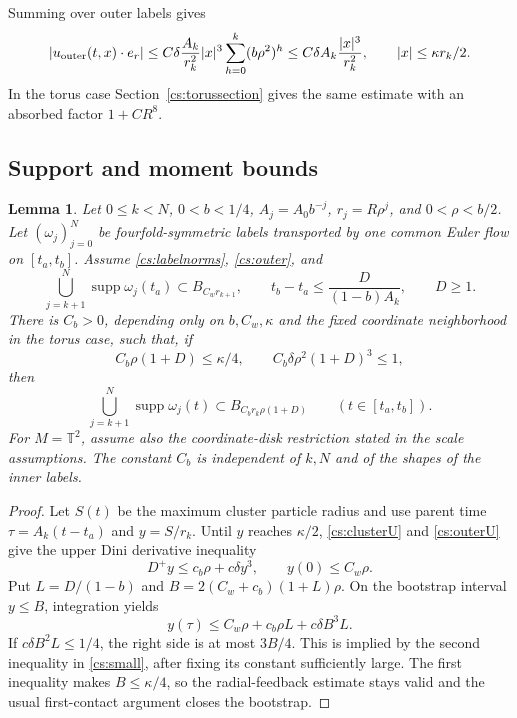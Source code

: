 \documentclass[11pt]{amsart}
\newtheorem{lemma}[theorem]{Lemma}
\theoremstyle{remark}
\numberwithin{equation}{section}
\newcommand{\T}{\mathbb T}
\begin{document}
Summing over outer labels gives
\begin{equation}\label{cs:outerU}
 |u_{\rm outer}(t,x)\cdot e_r|
 \le C\delta\frac{A_k}{r_k^2}|x|^3
 \sum_{h=0}^k(b\rho^2)^h
 \le C\delta A_k\frac{|x|^3}{r_k^2},
 \qquad |x|\le\kappa r_k/2.
\end{equation}
In the torus case Section~\ref{cs:torussection} gives the same estimate with an absorbed factor $1+CR^8$.

\subsection{Support and moment bounds}
\begin{lemma}
\label{cs:supportlemma}
Let $0\le k<N$, $0<b<1/4$, $A_j=A_0b^{-j}$,
$r_j=R\rho^j$, and $0<\rho<b/2$. Let
$(\omega_j)_{j=0}^N$ be fourfold-symmetric labels transported by
one common Euler flow on $[t_a,t_b]$. Assume
\eqref{cs:labelnorms}, \eqref{cs:outer}, and
\[
 \bigcup_{j=k+1}^N\operatorname{supp}\omega_j(t_a)
      \subset B_{C_wr_{k+1}},\qquad
 t_b-t_a\le\frac{D}{(1-b)A_k},\qquad D\ge1.
\]
There is $C_b>0$, depending only on $b,C_w,\kappa$ and the fixed
coordinate neighborhood in the torus case, such that, if
\begin{equation}\label{cs:small}
 C_b\rho(1+D)\le\kappa/4,\qquad
 C_b\delta\rho^2(1+D)^3\le1,
\end{equation}
then
\begin{equation}\label{cs:radius}
 \bigcup_{j=k+1}^N\operatorname{supp}\omega_j(t)
 \subset B_{C_b r_k\rho(1+D)}
 \qquad(t\in[t_a,t_b]).
\end{equation}
For $M=\T^2$, assume also the coordinate-disk restriction stated
in the scale assumptions. The constant $C_b$ is independent of
$k,N$ and of the shapes of the inner labels.
\end{lemma}
\begin{proof}
Let $S(t)$ be the maximum cluster particle radius and use parent time $\tau=A_k(t-t_a)$ and $y=S/r_k$. Until $y$ reaches $\kappa/2$, \eqref{cs:clusterU} and \eqref{cs:outerU} give the upper Dini derivative inequality
\[
 D^+y\le c_b\rho+c\delta y^3,\qquad y(0)\le C_w\rho.
\]
Put $L=D/(1-b)$ and $B=2(C_w+c_b)(1+L)\rho$. On the bootstrap interval $y\le B$, integration yields
\[
 y(\tau)\le C_w\rho+c_b\rho L+c\delta B^3L.
\]
If $c\delta B^2L\le1/4$, the right side is at most $3B/4$. This is implied by the second inequality in \eqref{cs:small}, after fixing its constant sufficiently large. The first inequality makes $B\le\kappa/4$, so the radial-feedback estimate stays valid and the usual first-contact argument closes the bootstrap.
\end{proof}
\end{document}
